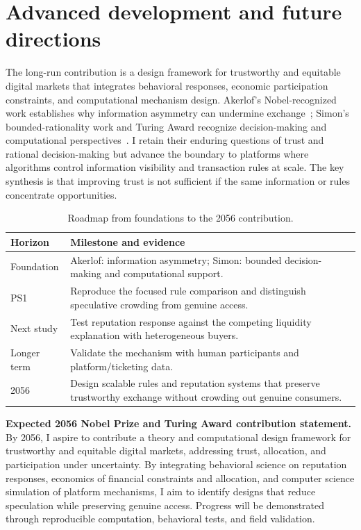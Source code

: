 \section{Advanced development and future directions}
The long-run contribution is a design framework for trustworthy and equitable digital markets that integrates behavioral responses, economic participation constraints, and computational mechanism design. Akerlof's Nobel-recognized work establishes why information asymmetry can undermine exchange~\cite{akerlof1970,nobel_akerlof}; Simon's bounded-rationality work and Turing Award recognize decision-making and computational perspectives~\cite{simon1955,simon1978,simon_turing}. I retain their enduring questions of trust and rational decision-making but advance the boundary to platforms where algorithms control information visibility and transaction rules at scale. The key synthesis is that improving trust is not sufficient if the same information or rules concentrate opportunities.

\begin{table}[h]
\caption{Roadmap from foundations to the 2056 contribution.}
\begin{tabularx}{\columnwidth}{@{}p{1.45cm}Y@{}}\toprule
\textbf{Horizon}&\textbf{Milestone and evidence}\\\midrule
Foundation&Akerlof: information asymmetry; Simon: bounded decision-making and computational support.\\
PS1&Reproduce the focused rule comparison and distinguish speculative crowding from genuine access.\\
Next study&Test reputation response against the competing liquidity explanation with heterogeneous buyers.\\
Longer term&Validate the mechanism with human participants and platform/ticketing data.\\
2056&Design scalable rules and reputation systems that preserve trustworthy exchange without crowding out genuine consumers.\\
\bottomrule
\end{tabularx}
\end{table}

\noindent\textbf{Expected 2056 Nobel Prize and Turing Award contribution statement.}
By 2056, I aspire to contribute a theory and computational design framework for trustworthy and equitable digital markets, addressing trust, allocation, and participation under uncertainty. By integrating behavioral science on reputation responses, economics of financial constraints and allocation, and computer science simulation of platform mechanisms, I aim to identify designs that reduce speculation while preserving genuine access. Progress will be demonstrated through reproducible computation, behavioral tests, and field validation.

